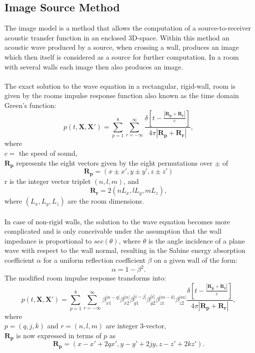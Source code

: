 \subsection{Image Source Method}
The image model is a method that allows the computation of a source-to-receiver acoustic transfer function in an enclosed 3D-space. Within this method an acoustic wave produced by a source, when crossing a wall, produces an image which then itself is considered as a source for further computation. In a room with several walls each image then also produces an image.\cite{Allen1979}
\\\\
The exact solution to the wave equation in a rectangular, rigid-wall, room is given by the rooms impulse response function also known as the time domain Green's function\cite{Allen1979}:
\begin{equation}
    p(t,\mathbf{X},\mathbf{X'})=\sum_{p=1}^8\sum_{r=-\infty}^\infty\frac{\delta[t-\frac{|\mathbf{R_p}+\mathbf{R_r}|}{c}]}{4\pi|\mathbf{R_p}+\mathbf{R_r}|},
\end{equation}
where\\ 
$c=$ the speed of sound,\\
$\mathbf{R_p}$ represents the eight vectors given by the eight permutations over $\pm$ of
\begin{equation}
    \mathbf{R_p}=(x\pm x', y\pm y', z\pm z')
\end{equation}
r is the integer vector triplet $(n,l,m)$, and
\begin{equation}
    \mathbf{R_r}=2(nL_x, lL_y, mL_z),
\end{equation}
where $(L_x, L_y, L_z)$ are the room dimensions.
\\
\\
In case of non-rigid walls, the solution to the wave equation becomes more complicated and is only conceivable under the assumption that the wall impedance is proportional to $sec(\theta)$, where $\theta$ is the angle incidence of a plane wave with respect to the wall normal, resulting in the Sabine energy absorption coefficient $\alpha$ for a uniform reflection coefficient $\beta$ on a given wall of the form\cite{Allen1979}:
\begin{equation}
    \alpha=1-\beta^2.
\end{equation}
The modified room impulse response transforms into:
\begin{equation}
    p(t,\mathbf{X},\mathbf{X'})=\sum_{p=1}^8\sum_{r=-\infty}^\infty
    \beta_{x1}^{|n-q|}\beta_{x2}^{|n|}\beta_{y1}^{|i-j|}\beta_{y2}^{|i|}\beta_{z1}^{|m-k|}\beta_{z2}^{|m|}
    \frac{\delta[t-\frac{|\mathbf{R_p}+\mathbf{R_r}|}{c}]}{4\pi|\mathbf{R_p}+\mathbf{R_r}|},
\end{equation}
where\\
$p=(q,j,k)$ and $r=(n,l,m)$ are integer 3-vector,\\
$\mathbf{R_p}$ is now expressed in terms of $p$ as
\begin{equation}
    \mathbf{R_p}=(x-x'+2qx', y-y'+2jy,z-z'+2kz').
\end{equation}

